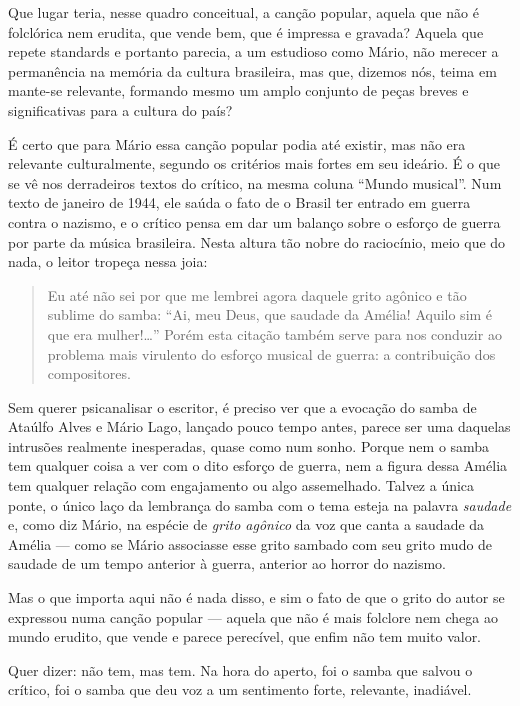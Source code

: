 Que lugar teria, nesse quadro conceitual, a canção popular, aquela que
não é folclórica nem erudita, que vende bem, que é impressa e gravada?
Aquela que repete standards e portanto parecia, a um estudioso como
Mário, não merecer a permanência na memória da cultura brasileira, mas
que, dizemos nós, teima em mante-se relevante, formando mesmo um amplo
conjunto de peças breves e significativas para a cultura do país?

É certo que para Mário essa canção popular podia até existir, mas não
era relevante culturalmente, segundo os critérios mais fortes em seu
ideário. É o que se vê nos derradeiros textos do crítico, na mesma
coluna ``Mundo musical''. Num texto de janeiro de 1944, ele saúda o fato
de o Brasil ter entrado em guerra contra o nazismo, e o crítico pensa em
dar um balanço sobre o esforço de guerra por parte da música brasileira.
Nesta altura tão nobre do raciocínio, meio que do nada, o leitor tropeça
nessa joia:

\begin{quote}
Eu até não sei por que me lembrei agora daquele grito agônico e tão
sublime do samba: ``Ai, meu Deus, que saudade da Amélia! Aquilo sim é
que era mulher!\ldots{}'' Porém esta citação também serve para nos conduzir
ao problema mais virulento do esforço musical de guerra: a contribuição
dos compositores.
\end{quote}

Sem querer psicanalisar o escritor, é preciso ver que a evocação do
samba de Ataúlfo Alves e Mário Lago, lançado pouco tempo antes, parece
ser uma daquelas intrusões realmente inesperadas, quase como num sonho.
Porque nem o samba tem qualquer coisa a ver com o dito esforço de
guerra, nem a figura dessa Amélia tem qualquer relação com engajamento
ou algo assemelhado. Talvez a única ponte, o único laço da lembrança do
samba com o tema esteja na palavra \textit{saudade} e, como diz Mário, na
espécie de \textit{grito agônico} da voz que canta a saudade da Amélia ---
como se Mário associasse esse grito sambado com seu grito mudo de
saudade de um tempo anterior à guerra, anterior ao horror do nazismo.

Mas o que importa aqui não é nada disso, e sim o fato de que o grito do
autor se expressou numa canção popular --- aquela que não é mais folclore
nem chega ao mundo erudito, que vende e parece perecível, que enfim não
tem muito valor.

Quer dizer: não tem, mas tem. Na hora do aperto, foi o samba que salvou
o crítico, foi o samba que deu voz a um sentimento forte, relevante,
inadiável.

